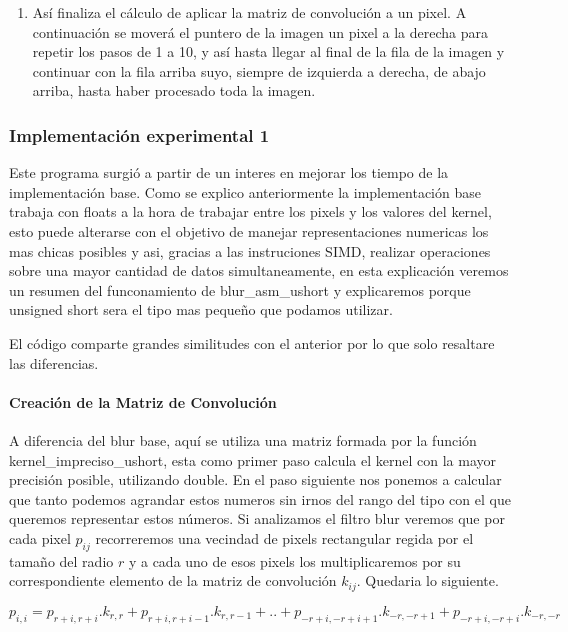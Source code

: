 \begin{enumerate}
	\item Así finaliza el cálculo de aplicar la matriz de convolución a un
		pixel. A continuación se moverá el puntero de la imagen un pixel a la
		derecha para repetir los pasos de 1 a 10, y así hasta llegar al final de
		la fila de la imagen y continuar con la fila arriba suyo, siempre de
		izquierda a derecha, de abajo arriba, hasta haber procesado toda la
		imagen.

\end{enumerate}



\subsubsection{Implementación experimental 1}
\label{sec:blur_imp_exp}

Este programa surgió a partir de un interes en mejorar los tiempo de la implementación base. Como se explico anteriormente la implementación base trabaja con floats a la hora de trabajar entre los pixels y los valores del kernel, esto puede alterarse con el objetivo de manejar representaciones numericas los mas chicas posibles y asi, gracias a las instruciones SIMD, realizar operaciones sobre una mayor cantidad de datos simultaneamente, en esta explicación veremos un resumen del funconamiento de blur\_asm\_ushort y explicaremos porque unsigned short sera el tipo mas pequeño que podamos utilizar.

El código comparte grandes similitudes con el anterior por lo que solo resaltare las diferencias. 

\paragraph{Creación de la Matriz de Convolución}

A diferencia del blur base, aquí se utiliza una matriz formada por la función kernel\_impreciso\_ushort, esta como primer paso calcula el kernel con la mayor precisión posible, utilizando double. En el paso siguiente nos ponemos a calcular que tanto podemos agrandar estos numeros sin irnos del rango del tipo con el que queremos representar estos números. Si analizamos el filtro blur veremos que por cada pixel $p_{ij}$ recorreremos una vecindad de pixels rectangular regida por el tamaño del radio $r$ y a cada uno de esos pixels los multiplicaremos por su correspondiente elemento de la matriz de convolución $k_{ij}$. Quedaria lo siguiente.

$$ p_{i,i} = p_{r+i,r+i}.k_{r,r} + p_{r+i,r+i-1}.k_{r,r-1} + .. + p_{-r+i,-r+i+1}.k_{-r,-r+1} + p_{-r+i,-r+i}.k_{-r,-r} $$

